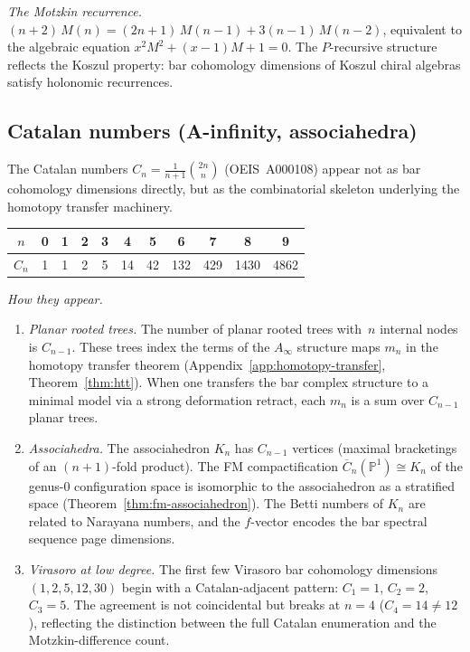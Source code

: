 \emph{The Motzkin recurrence.}
$(n+2)\,M(n) = (2n+1)\,M(n-1) + 3(n-1)\,M(n-2)$, equivalent to the algebraic equation $x^2 M^2 + (x-1)M + 1 = 0$.  The $P$-recursive structure reflects the Koszul property: bar cohomology dimensions of Koszul chiral algebras satisfy holonomic recurrences.

\subsection{Catalan numbers (A-infinity, associahedra)}
\label{subsec:catalan}

The Catalan numbers $C_n = \frac{1}{n+1}\binom{2n}{n}$ (OEIS~A000108) appear not as bar cohomology dimensions directly, but as the combinatorial skeleton underlying the homotopy transfer machinery.

\begin{center}
\renewcommand{\arraystretch}{1.2}
\begin{tabular}{c|cccccccccc}
$n$ & 0 & 1 & 2 & 3 & 4 & 5 & 6 & 7 & 8 & 9 \\
\hline
$C_n$ & 1 & 1 & 2 & 5 & 14 & 42 & 132 & 429 & 1430 & 4862
\end{tabular}
\end{center}

\emph{How they appear.}

\begin{enumerate}[label=(\roman*)]
\item \emph{Planar rooted trees.}  The number of planar rooted trees with~$n$ internal nodes is $C_{n-1}$.  These trees index the terms of the $A_\infty$ structure maps $m_n$ in the homotopy transfer theorem (Appendix~\ref{app:homotopy-transfer}, Theorem~\ref{thm:htt}).  When one transfers the bar complex structure to a minimal model via a strong deformation retract, each $m_n$ is a sum over $C_{n-1}$ planar trees.

\item \emph{Associahedra.}  The associahedron $K_n$ has $C_{n-1}$ vertices (maximal bracketings of an $(n+1)$-fold product).  The FM compactification $\overline{C}_n(\mathbb{P}^1) \cong K_n$ of the genus-$0$ configuration space is isomorphic to the associahedron as a stratified space (Theorem~\ref{thm:fm-associahedron}).  The Betti numbers of $K_n$ are related to Narayana numbers, and the $f$-vector encodes the bar spectral sequence page dimensions.

\item \emph{Virasoro at low degree.}  The first few Virasoro bar cohomology dimensions $(1, 2, 5, 12, 30)$ begin with a Catalan-adjacent pattern: $C_1 = 1$, $C_2 = 2$, $C_3 = 5$.  The agreement is not coincidental but breaks at $n = 4$ ($C_4 = 14 \neq 12$), reflecting the distinction between the full Catalan enumeration and the Motzkin-difference count.
\end{enumerate}

